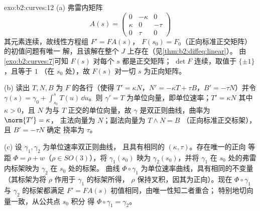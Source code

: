 \begin{solution}{exo:b2:curves:12}
(a) 弗雷内矩阵
\[
A(s) = \begin{pmatrix} 0 & -\kappa & 0\\ \kappa & 0 & -\tau\\
0 & \tau & 0\end{pmatrix}
\]
其元素连续，故线性方程组 $F' = FA(s)$，
$F(s_0) = F_0$（正向标准正交矩阵）的初值问题有唯一
解，且该解在整个 $J$ 上存在（见\cref{thm:b2:diffeq:linear}）。
由\cref{exo:b2:curves:7}可知 $F(s)$ 对每个 $s$ 都是正交矩阵；
$\det F$ 连续，取值于 $\{\pm1\}$，且等于 $1$
（在 $s_0$ 处），故 $F(s)$ 对一切 $s$ 为正向矩阵。

(b) 读出 $T, N, B$ 为 $F$ 的各行（使得 $T' = \kappa
N$，$N' = -\kappa T + \tau B$，$B' = -\tau N$）并令
$\gamma(s) = \gamma_0 + \int_{s_0}^s T(u)\,\dd u$。则
$\gamma' = T$ 为单位向量，即单位速率；$T' = \kappa N$
其中 $\kappa > 0$，且 $N$ 为与 $T$ 正交的单位向量，故 $\gamma$
是双正则曲线，曲率为 $\norm{T'} = \kappa$，
主法向量为 $N$；副法向量为 $T \wedge N = B$
（正向标准正交标架），且 $B' = -\tau N$ 确定
挠率为 $\tau$。

(c) 设 $\gamma_1, \gamma_2$ 为单位速率双正则曲线，
且具有相同的 $(\kappa, \tau)$。存在唯一的正向
等距 $\Phi = \rho + w$（$\rho \in SO(3)$），将
$\gamma_1(s_0)$ 映为 $\gamma_2(s_0)$，并将
$\gamma_1$ 在 $s_0$ 处的弗雷内标架映为 $\gamma_2$ 在 $s_0$ 处的标架。
曲线 $\Phi\circ\gamma_1$ 为单位速率曲线，具有相同的不变量
（其标架为将 $\rho$ 作用于 $\gamma_1$ 的标架所得，
$\rho$ 保持叉积，因其为正向）。现在
$\Phi\circ\gamma_1$ 与 $\gamma_2$ 的标架都满足 $F' =
FA(s)$ 初值相同，由唯一性知二者重合；
特别地切向量一致，从公共点 $s_0$ 积分
得 $\Phi\circ\gamma_1 = \gamma_2$。
\end{solution}

